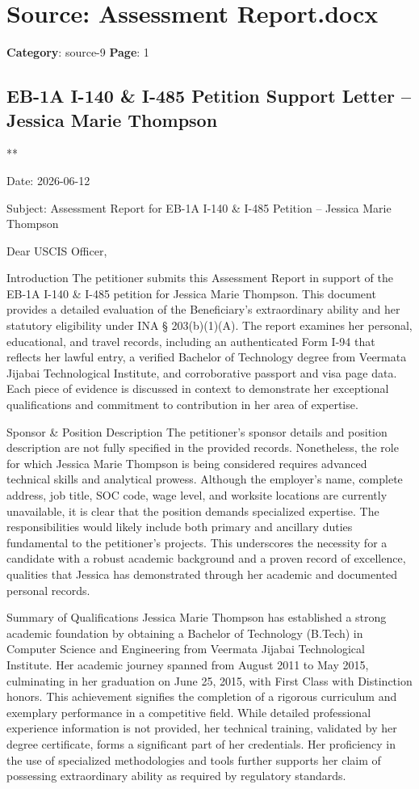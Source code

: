\section*{Source: Assessment Report.docx}
\textbf{Category}: source-9
\textbf{Page}: 1

\subsection*{EB-1A I-140 \& I-485 Petition Support Letter – Jessica Marie Thompson}

**

Date: 2026-06-12

Subject: Assessment Report for EB-1A I-140 \& I-485 Petition – Jessica Marie Thompson

Dear USCIS Officer,

Introduction
The petitioner submits this Assessment Report in support of the EB-1A I-140 \& I-485 petition for Jessica Marie Thompson. This document provides a detailed evaluation of the Beneficiary’s extraordinary ability and her statutory eligibility under INA § 203(b)(1)(A). The report examines her personal, educational, and travel records, including an authenticated Form I-94 that reflects her lawful entry, a verified Bachelor of Technology degree from Veermata Jijabai Technological Institute, and corroborative passport and visa page data. Each piece of evidence is discussed in context to demonstrate her exceptional qualifications and commitment to contribution in her area of expertise.

Sponsor \& Position Description
The petitioner’s sponsor details and position description are not fully specified in the provided records. Nonetheless, the role for which Jessica Marie Thompson is being considered requires advanced technical skills and analytical prowess. Although the employer’s name, complete address, job title, SOC code, wage level, and worksite locations are currently unavailable, it is clear that the position demands specialized expertise. The responsibilities would likely include both primary and ancillary duties fundamental to the petitioner’s projects. This underscores the necessity for a candidate with a robust academic background and a proven record of excellence, qualities that Jessica has demonstrated through her academic and documented personal records.

Summary of Qualifications
Jessica Marie Thompson has established a strong academic foundation by obtaining a Bachelor of Technology (B.Tech) in Computer Science and Engineering from Veermata Jijabai Technological Institute. Her academic journey spanned from August 2011 to May 2015, culminating in her graduation on June 25, 2015, with First Class with Distinction honors. This achievement signifies the completion of a rigorous curriculum and exemplary performance in a competitive field. While detailed professional experience information is not provided, her technical training, validated by her degree certificate, forms a significant part of her credentials. Her proficiency in the use of specialized methodologies and tools further supports her claim of possessing extraordinary ability as required by regulatory standards.

